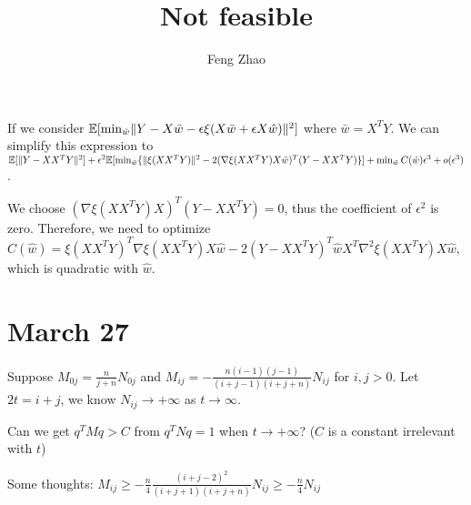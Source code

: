 \documentclass{article}
\title{Not feasible}
\author{Feng Zhao}
\DeclarePairedDelimiter\norm{\lVert}{\rVert}
\def\E{\mathbb{E}}
\begin{document}
\maketitle
If we consider $\E[\min_{\hat{w}}\norm{Y - X \bar{w} - \epsilon
\xi (X \bar{w} + \epsilon X \hat{w})}^2]$ where
$\bar{w} = X^T Y$. We can simplify this expression to
$\E[\norm{Y-XX^TY}^2] + \epsilon^2
\E[\min_{\hat{w}}\{\norm{\xi(XX^TY)}^2 -
2(\nabla \xi(XX^TY) X\hat{w})^T(Y-XX^TY)\}] +
\min_{\hat{w}}C(\hat{w})\epsilon^3 + o(\epsilon^3)$.

We choose $(\nabla \xi(XX^TY) X)^T (Y-XX^TY) = 0$,
thus the coefficient of $\epsilon^2$ is zero.
Therefore, we need to optimize
$C(\hat{w}) = \xi(XX^TY)^T \nabla \xi(XX^TY) X\hat{w} -
2(Y-XX^TY)^T\hat{w}X^T\nabla^2\xi(XX^TY)X\hat{w}$,
which is quadratic with $\hat{w}$.

\section{March 27}
Suppose $M_{0j} = \frac{n}{j+n}N_{0j}$ and
$M_{ij} = -\frac{n(i-1)(j-1)}{(i+j-1)(i+j+n)}
N_{ij}$
for $i,j>0$. Let $2t= i+j$, we know $N_{ij}
\to +\infty$ as $t \to \infty$.

Can we get $q^TMq > C$ from $q^TNq=1$ when $t \to +\infty$?
($C$ is a constant irrelevant with $t$)

Some thoughts: $ M_{ij} \geq 
-\frac{n}{4}\frac{(i+j-2)^2}{(i+j+1)(i+j+n)}N_{ij}
\geq -\frac{n}{4}N_{ij}$
\end{document}
